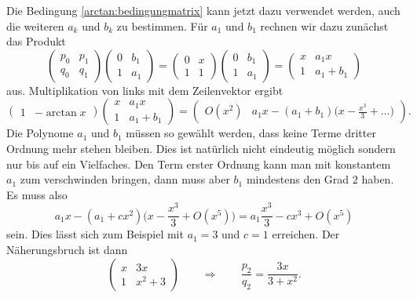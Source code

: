 \begin{refsection}
Die Bedingung \eqref{arctan:bedingungmatrix} kann jetzt dazu verwendet werden,
auch die weiteren $a_k$ und $b_k$ zu bestimmen.
Für $a_1$ und $b_1$ rechnen wir dazu zunächst das Produkt
\[
\begin{pmatrix}
p_0&p_1\\
q_0&q_1
\end{pmatrix}
\begin{pmatrix}
0&b_1\\
1&a_1
\end{pmatrix}
=
\begin{pmatrix}
0&x\\
1&1
\end{pmatrix}
\begin{pmatrix}
0&b_1\\
1&a_1
\end{pmatrix}
=
\begin{pmatrix}
x&a_1x\\
1&a_1+b_1
\end{pmatrix}
\]
aus. 
Multiplikation von links mit dem Zeilenvektor ergibt
\[
\begin{pmatrix}
1&-\arctan x
\end{pmatrix}
\begin{pmatrix}
x&a_1x\\
1&a_1+b_1
\end{pmatrix}
=
\begin{pmatrix}
O(x^2) & a_1x - (a_1+b_1)\biggl(\displaystyle x-\frac{x^3}3+\dots\biggr)
\end{pmatrix}.
\]
Die Polynome $a_1$ und $b_1$ müssen so gewählt werden, dass keine Terme
dritter Ordnung mehr stehen bleiben.
Dies ist natürlich nicht eindeutig möglich sondern nur bis auf ein
Vielfaches.
Den Term erster Ordnung kann man mit konstantem $a_1$ zum verschwinden
bringen, dann muss aber $b_1$ mindestens den Grad $2$ haben.
Es muss also
\[
a_1x-(a_1+cx^2)\biggl(x-\frac{x^3}3+O(x^5)\biggr)
=
a_1\frac{x^3}{3}-cx^3 + O(x^5)
\]
sein.
Dies lässt sich zum Beispiel mit $a_1=3$ und $c=1$ erreichen.
Der Näherungsbruch ist dann
\[
\begin{pmatrix}
x&3x\\
1&x^2+3
\end{pmatrix}
\qquad\Rightarrow\qquad
\frac{p_2}{q_2} = \frac{3x}{3+x^2}.
\]


\end{refsection}
